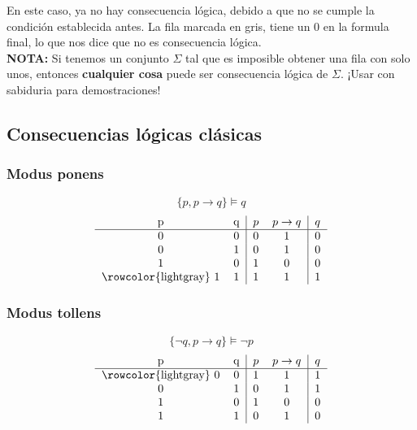 \documentclass{article}
\begin{document}
En este caso, ya no hay consecuencia lógica, debido a que no se cumple la condición establecida antes. La fila marcada en gris, tiene un 0 en la formula final, lo que nos dice que no es consecuencia lógica.\\
\textbf{NOTA:} Si tenemos un conjunto $\Sigma$ tal que es imposible obtener una fila con solo unos, entonces \textbf{cualquier cosa} puede ser consecuencia lógica de $\Sigma$. ¡Usar con sabiduria para demostraciones!

\subsection{Consecuencias lógicas clásicas}
\subsubsection{Modus ponens}
$$ \{ p, p \rightarrow{} q \} \models{} q $$
\[
    \begin{tabular}{cc|cc|c}
        p & q & $p$ & $p \rightarrow{} q$ & $q$ \\ \hline
        0 & 0 & 0 & 1 & 0 \\
        0 & 1 & 0 & 1 & 0 \\
        1 & 0 & 1 & 0 & 0 \\
        \rowcolor{lightgray} 1 & 1 & 1 & 1 & 1 \\
    \end{tabular}
\]

\subsubsection{Modus tollens}
$$\{ \neg{} q, p \rightarrow q \} \models{} \neg{} p$$
\[
    \begin{tabular}{cc|cc|c}
        p & q & $p$ & $p \rightarrow{} q$ & $q$ \\ \hline
        \rowcolor{lightgray} 0 & 0 & 1 & 1 & 1 \\
        0 & 1 & 0 & 1 & 1 \\
        1 & 0 & 1 & 0 & 0 \\
        1 & 1 & 0 & 1 & 0 \\
    \end{tabular}
\]
\end{document}
